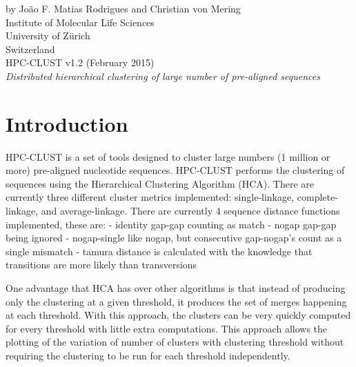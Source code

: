 \documentclass[10pt,a4paper]{article}
\begin{document}
 

\pagestyle{empty} %

{
 \raggedleft %
 \vspace*{\baselineskip} %
 {\Large by Jo\~ao F. Matias Rodrigues and Christian von Mering\\
 Institute of Molecular Life Sciences\\University of Z\"urich\\Switzerland}\\[0.167\textheight] %
 {\Huge HPC-CLUST v1.2 (February 2015)}\\[\baselineskip] %
 {\Large \textit{Distributed hierarchical clustering of large number of pre-aligned sequences}}\par %
}
\vfill %
\vspace*{3\baselineskip} %

\newpage

\tableofcontents
\newpage
{}

\section{Introduction}

HPC-CLUST is a set of tools designed to cluster large numbers (1 million or more)
pre-aligned nucleotide sequences. HPC-CLUST performs the clustering of sequences
using the Hierarchical Clustering Algorithm (HCA). There are currently three different
cluster metrics implemented: single-linkage, complete-linkage, and average-linkage.
There are currently 4 sequence distance functions implemented, these are:
- identity
    gap-gap counting as match
- nogap
    gap-gap being ignored
- nogap-single
    like nogap, but consecutive gap-nogap's count as a single mismatch
- tamura
    distance is calculated with the knowledge that transitions are more likely than
   transversions

One advantage that HCA has over other algorithms is that instead of producing only the
clustering at a given threshold, it produces the set of merges happening at each threshold.
With this approach, the clusters can be very quickly computed for every threshold with
little extra computations. This approach allows the plotting of the variation of
number of clusters with clustering threshold without requiring the clustering to be run
for each threshold independently.
\end{document}
